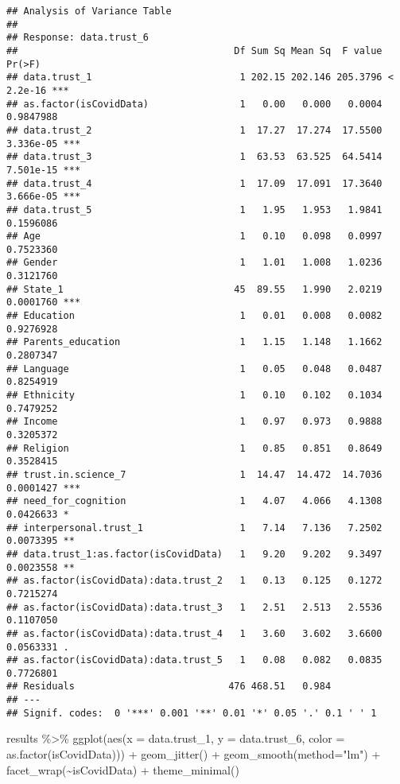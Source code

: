 \documentclass[
]{article}
\newenvironment{Shaded}{\begin{snugshade}}{\end{snugshade}}
\newcommand{\AttributeTok}[1]{\textcolor[rgb]{0.77,0.63,0.00}{#1}}
\newcommand{\FunctionTok}[1]{\textcolor[rgb]{0.00,0.00,0.00}{#1}}
\newcommand{\NormalTok}[1]{#1}
\newcommand{\SpecialCharTok}[1]{\textcolor[rgb]{0.00,0.00,0.00}{#1}}
\newcommand{\StringTok}[1]{\textcolor[rgb]{0.31,0.60,0.02}{#1}}
\begin{document}
\begin{verbatim}
## Analysis of Variance Table
## 
## Response: data.trust_6
##                                      Df Sum Sq Mean Sq  F value    Pr(>F)    
## data.trust_1                          1 202.15 202.146 205.3796 < 2.2e-16 ***
## as.factor(isCovidData)                1   0.00   0.000   0.0004 0.9847988    
## data.trust_2                          1  17.27  17.274  17.5500 3.336e-05 ***
## data.trust_3                          1  63.53  63.525  64.5414 7.501e-15 ***
## data.trust_4                          1  17.09  17.091  17.3640 3.666e-05 ***
## data.trust_5                          1   1.95   1.953   1.9841 0.1596086    
## Age                                   1   0.10   0.098   0.0997 0.7523360    
## Gender                                1   1.01   1.008   1.0236 0.3121760    
## State_1                              45  89.55   1.990   2.0219 0.0001760 ***
## Education                             1   0.01   0.008   0.0082 0.9276928    
## Parents_education                     1   1.15   1.148   1.1662 0.2807347    
## Language                              1   0.05   0.048   0.0487 0.8254919    
## Ethnicity                             1   0.10   0.102   0.1034 0.7479252    
## Income                                1   0.97   0.973   0.9888 0.3205372    
## Religion                              1   0.85   0.851   0.8649 0.3528415    
## trust.in.science_7                    1  14.47  14.472  14.7036 0.0001427 ***
## need_for_cognition                    1   4.07   4.066   4.1308 0.0426633 *  
## interpersonal.trust_1                 1   7.14   7.136   7.2502 0.0073395 ** 
## data.trust_1:as.factor(isCovidData)   1   9.20   9.202   9.3497 0.0023558 ** 
## as.factor(isCovidData):data.trust_2   1   0.13   0.125   0.1272 0.7215274    
## as.factor(isCovidData):data.trust_3   1   2.51   2.513   2.5536 0.1107050    
## as.factor(isCovidData):data.trust_4   1   3.60   3.602   3.6600 0.0563331 .  
## as.factor(isCovidData):data.trust_5   1   0.08   0.082   0.0835 0.7726801    
## Residuals                           476 468.51   0.984                       
## ---
## Signif. codes:  0 '***' 0.001 '**' 0.01 '*' 0.05 '.' 0.1 ' ' 1
\end{verbatim}

\begin{Shaded}
\begin{Highlighting}[]
\NormalTok{results }\SpecialCharTok{\%\textgreater{}\%}
  \FunctionTok{ggplot}\NormalTok{(}\FunctionTok{aes}\NormalTok{(}\AttributeTok{x =}\NormalTok{ data.trust\_1, }\AttributeTok{y =}\NormalTok{ data.trust\_6, }\AttributeTok{color =} \FunctionTok{as.factor}\NormalTok{(isCovidData))) }\SpecialCharTok{+}
  \FunctionTok{geom\_jitter}\NormalTok{() }\SpecialCharTok{+}
  \FunctionTok{geom\_smooth}\NormalTok{(}\AttributeTok{method=}\StringTok{"lm"}\NormalTok{) }\SpecialCharTok{+}
  \FunctionTok{facet\_wrap}\NormalTok{(}\SpecialCharTok{\textasciitilde{}}\NormalTok{isCovidData) }\SpecialCharTok{+}
  \FunctionTok{theme\_minimal}\NormalTok{()}
\end{Highlighting}
\end{Shaded}
\end{document}
